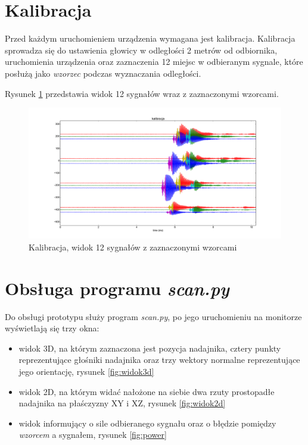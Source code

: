 \section{Kalibracja}

Przed każdym uruchomieniem urządzenia wymagana jest kalibracja.
Kalibracja sprowadza się do ustawienia głowicy w odległości 2 metrów od odbiornika,
uruchomienia urządzenia oraz zaznaczenia 12 miejsc w odbieranym sygnale, które posłużą jako \textit{wzorzec}
podczas wyznaczania odległości.

Rysunek \ref{fig:kalibracja_12x} przedstawia widok 12 sygnałów wraz z zaznaczonymi wzorcami.


 \begin{figure}[h!]
    \centering
    \includegraphics[width=1.12\textwidth, trim= 46mm 0mm 0mm 0mm,clip]{kalibracja_12x}
    \caption{Kalibracja, widok 12 sygnałów z zaznaczonymi wzorcami}
    \label{fig:kalibracja_12x}
\end{figure}

\section{Obsługa programu \textit{scan.py}}

Do obsługi prototypu służy program \textit{scan.py}, po jego uruchomieniu 
na monitorze wyświetlają się trzy okna: 
\begin{itemize}
 \item widok 3D, na którym zaznaczona jest 
pozycja nadajnika, cztery punkty reprezentujące głośniki nadajnika oraz trzy wektory normalne reprezentujące 
jego orientację, rysunek \ref{fig:widok3d}
 \item widok 2D, na którym widać nałożone na siebie dwa rzuty prostopadłe nadajnika na płaśczyzny XY i XZ, rysunek \ref{fig:widok2d}
 \item widok informujący o sile odbieranego sygnału oraz o błędzie pomiędzy \textit{wzorcem} a sygnałem, rysunek \ref{fig:power}
\end{itemize}


